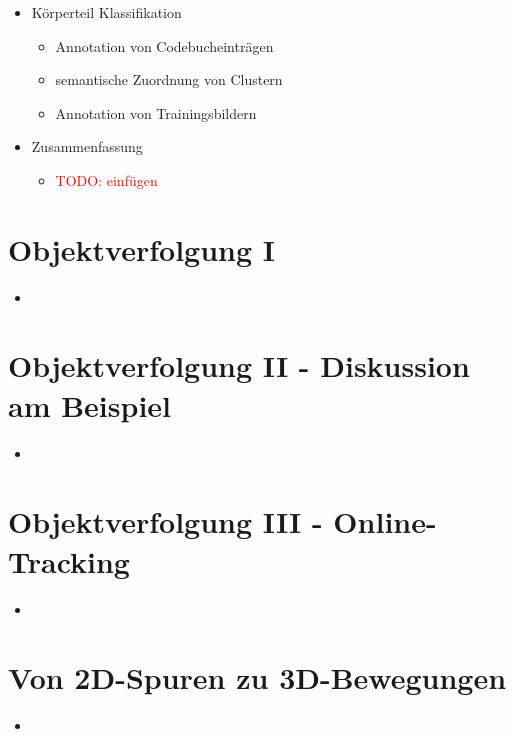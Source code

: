 \documentclass{report}
\newcommand{\todo}[2][red]{\textcolor{#1}{TODO: #2}}
\begin{document}
\begin{itemize}
		\item Körperteil Klassifikation
		\begin{itemize}
			\item Annotation von Codebucheinträgen
			\item semantische Zuordnung von Clustern\newline
			
			\item Annotation von Trainingsbildern
		\end{itemize}
		
		\item Zusammenfassung
		\begin{itemize}
			\item \todo{einfügen}
		\end{itemize}
		
	\end{itemize}
	\newpage
	
	\section{Objektverfolgung I}
	
	\begin{itemize}
		\item 
	\end{itemize}
	
	
	\section{Objektverfolgung II - Diskussion am Beispiel}
	
	\begin{itemize}
		\item 
	\end{itemize}
	
	
	\section{Objektverfolgung III - Online-Tracking}
	
	\begin{itemize}
		\item 
	\end{itemize}
	
	
	\section{Von 2D-Spuren zu 3D-Bewegungen}
	
	\begin{itemize}
		\item 
	\end{itemize}
	
\end{document}
